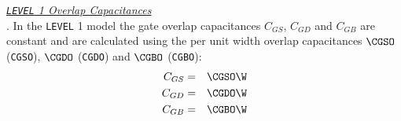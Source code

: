 \noindent\underline{\sl \large {\tt LEVEL} 1 Overlap Capacitances}\\[0.1in]
    . In the {\tt LEVEL} 1 model the
gate overlap capacitances $C_{GS}$, $C_{GD}$ and $C_{GB}$ are
constant and are calculated using the per unit width overlap
capacitances $\CGSO$ ({\tt CGSO}), $\CGDO$ ({\tt CGDO}) and
$\CGBO$ ({\tt CGBO}):
\begin{eqnarray}
C_{GS}&=&\CGSO\W \\
C_{GD}&=&\CGDO\W \\
C_{GB}&=&\CGBO\W
\end{eqnarray}
